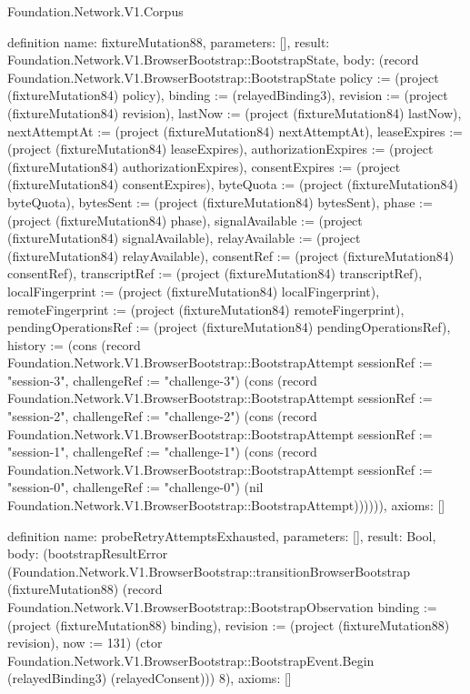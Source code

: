 \begin{lexlean}{Foundation.Network.V1.Corpus}
\begin{semanticmodule}
definition{
  name: fixtureMutation88,
  parameters: [],
  result: Foundation.Network.V1.BrowserBootstrap::BootstrapState,
  body: (record Foundation.Network.V1.BrowserBootstrap::BootstrapState {policy := (project (fixtureMutation84) policy), binding := (relayedBinding3), revision := (project (fixtureMutation84) revision), lastNow := (project (fixtureMutation84) lastNow), nextAttemptAt := (project (fixtureMutation84) nextAttemptAt), leaseExpires := (project (fixtureMutation84) leaseExpires), authorizationExpires := (project (fixtureMutation84) authorizationExpires), consentExpires := (project (fixtureMutation84) consentExpires), byteQuota := (project (fixtureMutation84) byteQuota), bytesSent := (project (fixtureMutation84) bytesSent), phase := (project (fixtureMutation84) phase), signalAvailable := (project (fixtureMutation84) signalAvailable), relayAvailable := (project (fixtureMutation84) relayAvailable), consentRef := (project (fixtureMutation84) consentRef), transcriptRef := (project (fixtureMutation84) transcriptRef), localFingerprint := (project (fixtureMutation84) localFingerprint), remoteFingerprint := (project (fixtureMutation84) remoteFingerprint), pendingOperationsRef := (project (fixtureMutation84) pendingOperationsRef), history := (cons (record Foundation.Network.V1.BrowserBootstrap::BootstrapAttempt {sessionRef := "session-3", challengeRef := "challenge-3"}) (cons (record Foundation.Network.V1.BrowserBootstrap::BootstrapAttempt {sessionRef := "session-2", challengeRef := "challenge-2"}) (cons (record Foundation.Network.V1.BrowserBootstrap::BootstrapAttempt {sessionRef := "session-1", challengeRef := "challenge-1"}) (cons (record Foundation.Network.V1.BrowserBootstrap::BootstrapAttempt {sessionRef := "session-0", challengeRef := "challenge-0"}) (nil Foundation.Network.V1.BrowserBootstrap::BootstrapAttempt)))))}),
  axioms: []
}

definition{
  name: probeRetryAttemptsExhausted,
  parameters: [],
  result: Bool,
  body: (bootstrapResultError (Foundation.Network.V1.BrowserBootstrap::transitionBrowserBootstrap (fixtureMutation88) (record Foundation.Network.V1.BrowserBootstrap::BootstrapObservation {binding := (project (fixtureMutation88) binding), revision := (project (fixtureMutation88) revision), now := 131}) (ctor Foundation.Network.V1.BrowserBootstrap::BootstrapEvent.Begin (relayedBinding3) (relayedConsent))) 8),
  axioms: []
}


\end{semanticmodule}
\end{lexlean}
